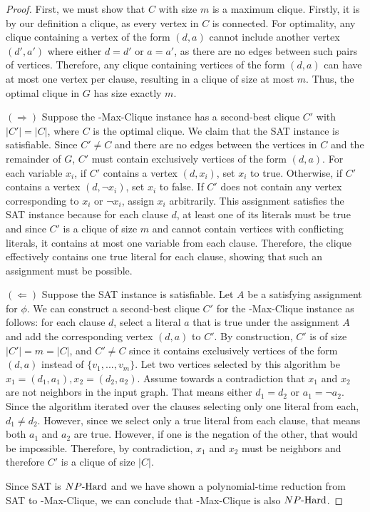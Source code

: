 \begin{proof}
First, we must show that $C$ with size $m$ is a maximum clique. Firstly, it is by our definition a clique, as every vertex in $C$ is connected. For optimality, any clique containing a vertex of the form $(d, a)$ cannot include another vertex $(d', a')$ where either $d = d'$ or $a = a'$, as there are no edges between such pairs of vertices. Therefore, any clique containing vertices of the form $(d, a)$ can have at most one vertex per clause, resulting in a clique of size at most $m$. Thus, the optimal clique in $G$ has size exactly $m$.

$(\Rightarrow)$ Suppose the \inob{}-Max-Clique instance has a second-best clique $C'$ with $|C'| = |C|$, where $C$ is the optimal clique. We claim that the SAT instance is satisfiable. Since $C' \neq C$ and there are no edges between the vertices in $C$ and the remainder of $G$, $C'$ must contain exclusively vertices of the form $(d, a)$. For each variable $x_i$, if $C'$ contains a vertex $(d, x_i)$, set $x_i$ to true. Otherwise, if $C'$ contains a vertex $(d, \neg x_i)$, set $x_i$ to false. If $C'$ does not contain any vertex corresponding to $x_i$ or $\neg x_i$, assign $x_i$ arbitrarily. This assignment satisfies the SAT instance because for each clause $d$, at least one of its literals must be true and since $C'$ is a clique of size $m$ and cannot contain vertices with conflicting literals, it contains at most one variable from each clause. Therefore, the clique effectively contains one true literal for each clause, showing that such an assignment must be possible.

$(\Leftarrow)$ Suppose the SAT instance is satisfiable. Let $A$ be a satisfying assignment for $\phi$. We can construct a second-best clique $C'$ for the \inob{}-Max-Clique instance as follows: for each clause $d$, select a literal $a$ that is true under the assignment $A$ and add the corresponding vertex $(d, a)$ to $C'$. By construction, $C'$ is of size $|C'| = m = |C|$, and $C' \neq C$ since it contains exclusively vertices of the form $(d, a)$ instead of $\{v_1, ..., v_m\}$. Let two vertices selected by this algorithm be $x_1 = (d_1, a_1), x_2 = (d_2, a_2)$. Assume towards a contradiction that $x_1$ and $x_2$ are not neighbors in the input graph. That means either $d_1 = d_2$ or $a_1 = \neg a_2$. Since the algorithm iterated over the clauses selecting only one literal from each, $d_1 \neq d_2$. However, since we select only a true literal from each clause, that means both $a_1$ and $a_2$ are true. However, if one is the negation of the other, that would be impossible. Therefore, by contradiction, $x_1$ and $x_2$ must be neighbors and therefore $C'$ is a clique of size $|C|$.

Since SAT is ${NP\text{-Hard{}}}$ and we have shown a polynomial-time reduction from SAT to \inob{}-Max-Clique, we can conclude that \inob{}-Max-Clique is also ${NP\text{-Hard{}}}$.

\end{proof}

